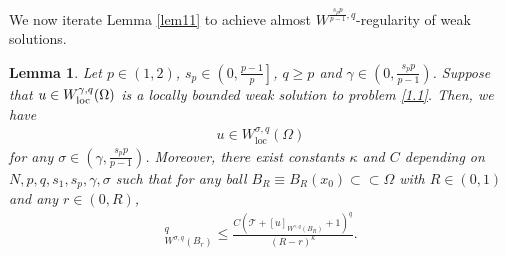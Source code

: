 \documentclass[reqno,10pt]{amsart}
\numberwithin{equation}{section}
\newtheorem{lemma}[theorem]{Lemma}
\begin{document}
We now iterate Lemma \ref{lem11} to achieve almost $W^{\frac{s_pp}{p-1},q}$-regularity of weak solutions.
\begin{lemma}\label{lem12}
	Let $p\in(1,2)$, $s_p\in \left(0,\frac{p-1}{p}\right]$, $q\geq p$ and $\gamma\in \left( 0, \frac{s_pp}{p-1}\right) $. Suppose that $u \in W_{\rm loc}^{\gamma, q}(\Omega)$ is a 
	locally bounded weak solution to problem \eqref{1.1}. Then, we have 	
	\begin{align*}
		u \in W_{\mathrm{loc}}^{\sigma, q}(\Omega)
	\end{align*}
	for any $\sigma \in\left(\gamma, \frac{s_p p}{p-1}\right)$. Moreover, there exist constants $\kappa$ and $C$ depending on $N,p,q,s_1,s_p,\gamma,\sigma$ such that for any ball $B_R\equiv B_R(x_0)\subset\subset\Omega$ with $R\in(0,1)$ and any $r\in(0,R)$,
	\begin{align*}
		[u]_{W^{\sigma, q}\left(B_r\right)}^q \leq \frac{C\left(\mathcal{T}+[u]_{W^{\gamma, q}\left(B_R\right)}+1\right)^q}{(R-r)^{\kappa}}.
	\end{align*}
\end{lemma}
\end{document}
